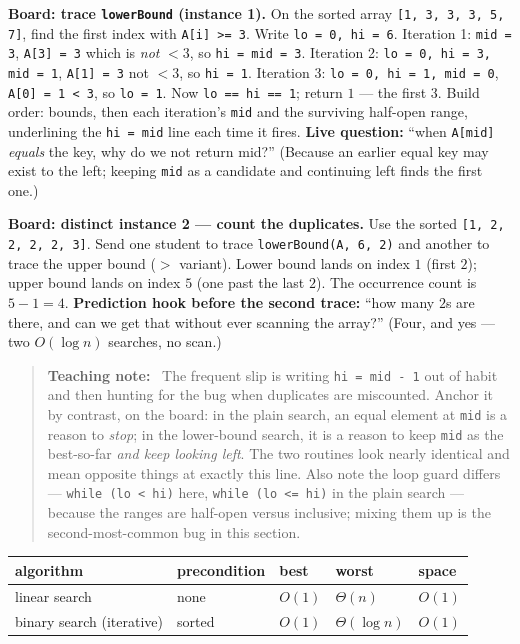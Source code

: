 \documentclass[11pt]{article}
\newenvironment{teachingaside}{\begin{quote}\small\color{primary-gold}\textbf{Teaching note:}\ }{\end{quote}}
\begin{document}
\textbf{Board: trace \texttt{lowerBound} (instance 1).} On the sorted array \texttt{[1, 3, 3, 3, 5, 7]}, find the first index with \texttt{A[i] >= 3}. Write \texttt{lo = 0, hi = 6}. Iteration 1: \texttt{mid = 3}, \texttt{A[3] = 3} which is \emph{not} $< 3$, so \texttt{hi = mid = 3}. Iteration 2: \texttt{lo = 0, hi = 3, mid = 1}, \texttt{A[1] = 3} not $< 3$, so \texttt{hi = 1}. Iteration 3: \texttt{lo = 0, hi = 1, mid = 0}, \texttt{A[0] = 1 < 3}, so \texttt{lo = 1}. Now \texttt{lo == hi == 1}; return $1$ --- the first $3$. Build order: bounds, then each iteration's \texttt{mid} and the surviving half-open range, underlining the \texttt{hi = mid} line each time it fires. \textbf{Live question:} ``when \texttt{A[mid]} \emph{equals} the key, why do we not return mid?'' (Because an earlier equal key may exist to the left; keeping \texttt{mid} as a candidate and continuing left finds the first one.)

\textbf{Board: distinct instance 2 --- count the duplicates.} Use the sorted \texttt{[1, 2, 2, 2, 2, 3]}. Send one student to trace \texttt{lowerBound(A, 6, 2)} and another to trace the upper bound ($>$ variant). Lower bound lands on index $1$ (first $2$); upper bound lands on index $5$ (one past the last $2$). The occurrence count is $5 - 1 = 4$. \textbf{Prediction hook before the second trace:} ``how many $2$s are there, and can we get that without ever scanning the array?'' (Four, and yes --- two $O(\log n)$ searches, no scan.)

\begin{teachingaside}
The frequent slip is writing \texttt{hi = mid - 1} out of habit and then hunting for the bug when duplicates are miscounted. Anchor it by contrast, on the board: in the plain search, an equal element at \texttt{mid} is a reason to \emph{stop}; in the lower-bound search, it is a reason to keep \texttt{mid} as the best-so-far \emph{and keep looking left}. The two routines look nearly identical and mean opposite things at exactly this line. Also note the loop guard differs --- \texttt{while (lo < hi)} here, \texttt{while (lo <= hi)} in the plain search --- because the ranges are half-open versus inclusive; mixing them up is the second-most-common bug in this section.
\end{teachingaside}

\begin{center}
{\footnotesize
\begin{tabular}{lllll}
  \toprule
  \textbf{algorithm} & \textbf{precondition} & \textbf{best} &
    \textbf{worst} & \textbf{space} \\
  \midrule
  linear search & none & $O(1)$ & $\Theta(n)$ & $O(1)$ \\
  binary search (iterative) & sorted & $O(1)$ & $\Theta(\log n)$ & $O(1)$ \\
  \bottomrule
\end{tabular}}
\end{center}
\end{document}
